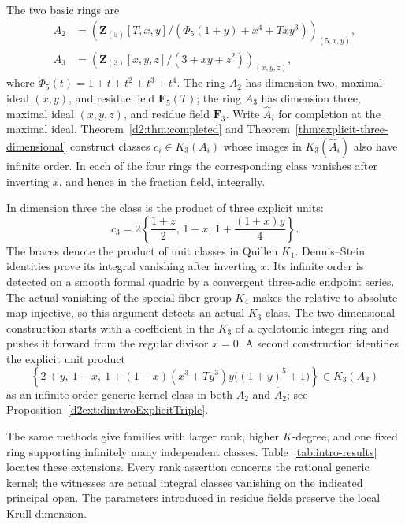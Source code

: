 \documentclass[11pt,a4paper]{amsart}
\numberwithin{equation}{section}
\theoremstyle{definition}
\theoremstyle{remark}
\newcommand{\Z}{\mathbf Z}
\newcommand{\F}{\mathbf F}
\begin{document}
The two basic rings are
\begin{equation}\label{eq:intro-basic-rings}
\begin{aligned}
 A_2&=\left(\Z_{(5)}[T,x,y]/
       (\Phi_5(1+y)+x^4+Txy^3)\right)_{(5,x,y)},\\
 A_3&=\left(\Z_{(3)}[x,y,z]/(3+xy+z^2)\right)_{(x,y,z)},
\end{aligned}
\end{equation}
where $\Phi_5(t)=1+t+t^2+t^3+t^4$.
The ring $A_2$ has dimension two, maximal ideal $(x,y)$, and residue
field $\F_5(T)$; the ring $A_3$ has dimension three, maximal ideal
$(x,y,z)$, and residue field $\F_3$.
Write $\widehat A_i$ for completion at the maximal ideal.
Theorem~\ref{d2:thm:completed} and
Theorem~\ref{thm:explicit-three-dimensional} construct classes
$c_i\in K_3(A_i)$ whose images in $K_3(\widehat A_i)$ also have
infinite order. In each of the four rings the corresponding class
vanishes after inverting $x$, and hence in the fraction field,
integrally.

In dimension three the class is the product of three explicit units:
\begin{equation}\label{eq:intro-explicit-three}
 c_3=2\left\{\frac{1+z}{2},\,1+x,\,
                   1+\frac{(1+x)y}{4}\right\}.
\end{equation}
The braces denote the product of unit classes in Quillen $K_1$.
Dennis--Stein identities prove its integral vanishing after inverting
$x$. Its infinite order is detected on a smooth formal quadric by a
convergent three-adic endpoint series. The actual vanishing of the
special-fiber group $K_4$ makes the relative-to-absolute map injective,
so this argument detects an actual $K_3$-class.
The two-dimensional construction starts with a coefficient in the
$K_3$ of a cyclotomic integer ring and pushes it forward from the
regular divisor $x=0$. A second construction identifies the explicit
unit product
\[
 \left\{2+y,\ 1-x,\
 1+(1-x)(x^3+Ty^3)y\bigl((1+y)^5+1\bigr)\right\}
 \in K_3(A_2)
\]
as an infinite-order generic-kernel class in both $A_2$ and
$\widehat A_2$; see Proposition~\ref{d2ext:dimtwoExplicitTriple}.

The same methods give families with larger rank, higher $K$-degree,
and one fixed ring supporting infinitely many independent classes.
Table~\ref{tab:intro-results} locates these extensions. Every rank
assertion concerns the rational generic kernel; the witnesses are
actual integral classes vanishing on the indicated principal open.
The parameters introduced in residue fields preserve the local
Krull dimension.
\end{document}
